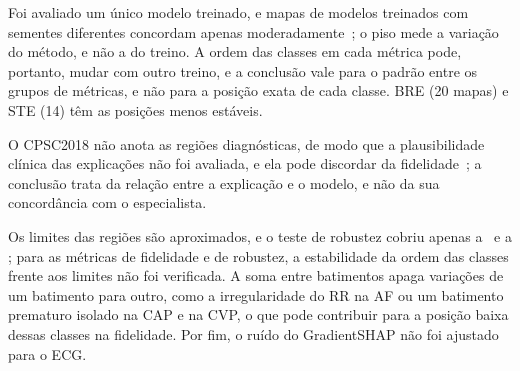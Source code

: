 Foi avaliado um único modelo treinado, e mapas de modelos treinados com sementes diferentes concordam apenas moderadamente~\cite{arends2026}; o piso mede a variação do método, e não a do treino. A ordem das classes em cada métrica pode, portanto, mudar com outro treino, e a conclusão vale para o padrão entre os grupos de métricas, e não para a posição exata de cada classe. BRE (20 mapas) e STE (14) têm as posições menos estáveis.

O CPSC2018 não anota as regiões diagnósticas, de modo que a plausibilidade clínica das explicações não foi avaliada, e ela pode discordar da fidelidade~\cite{storas2025}; a conclusão trata da relação entre a explicação e o modelo, e não da sua concordância com o especialista.

Os limites das regiões são aproximados, e o teste de robustez cobriu apenas a \CS\ e a \CX; para as métricas de fidelidade e de robustez, a estabilidade da ordem das classes frente aos limites não foi verificada. A soma entre batimentos apaga variações de um batimento para outro, como a irregularidade do RR na AF ou um batimento prematuro isolado na CAP e na CVP, o que pode contribuir para a posição baixa dessas classes na fidelidade. Por fim, o ruído do GradientSHAP não foi ajustado para o ECG.
